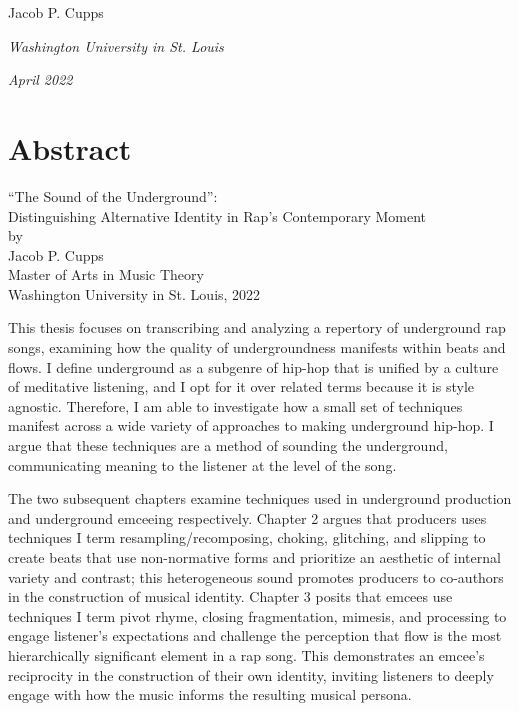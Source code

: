 \documentclass[12pt]{report}
\begin{document}
\vspace{0.2cm}
\hfill{Jacob P. Cupps}

\noindent \textit{Washington University in St. Louis}

\noindent \textit{April 2022}

    \chapter*{Abstract}
    
    \begin{center}
        \large ``The Sound of the Underground'': \\
        \large Distinguishing Alternative Identity in Rap's Contemporary Moment  \\
        \normalsize by \\
        Jacob P. Cupps \\
        Master of Arts in Music Theory \\
        
        Washington University in St. Louis, 2022 \\
    \end{center}
    

    \normalsize
    This thesis focuses on transcribing and analyzing a repertory of underground rap songs, examining
    how the quality of undergroundness manifests within beats and flows. I define underground as a
    subgenre of hip-hop that is unified by a culture of meditative listening, and I opt for it over
    related terms because it is style agnostic. Therefore, I am able to investigate how a small set
    of techniques manifest across a wide variety of approaches to making underground hip-hop. I argue
    that these techniques are a method of sounding the underground, communicating meaning to the 
    listener at the level of the song.

    The two subsequent chapters examine techniques used in underground production and underground
    emceeing respectively. Chapter 2 argues that producers uses techniques I term resampling/recomposing,
    choking, glitching, and slipping to create beats that use non-normative forms and prioritize an 
    aesthetic of internal variety and contrast; this heterogeneous sound promotes producers to co-authors
    in the construction of musical identity. Chapter 3 posits that emcees use techniques I term pivot rhyme,
    closing fragmentation, mimesis, and processing to engage listener's expectations and challenge the
    perception that flow is the most hierarchically significant element in a rap song. This demonstrates
    an emcee's reciprocity in the construction of their own identity, inviting listeners to deeply engage
    with how the music informs the resulting musical persona.
\end{document}
